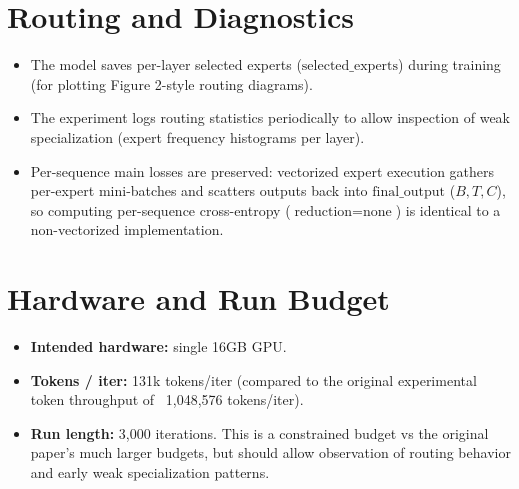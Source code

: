 \documentclass{article}
\begin{document}
\section{Routing and Diagnostics}
\begin{itemize}
    \item The model saves per-layer selected experts ($\text{selected\_experts}$) during training (for plotting Figure 2-style routing diagrams).
    \item The experiment logs routing statistics periodically to allow inspection of weak specialization (expert frequency histograms per layer).
    \item Per-sequence main losses are preserved: vectorized expert execution gathers per-expert mini-batches and scatters outputs back into $\text{final\_output}$ ($B, T, C$), so computing per-sequence cross-entropy ($\text{reduction}=\text{none}$) is identical to a non-vectorized implementation.
\end{itemize}

\section{Hardware and Run Budget}
\begin{itemize}
    \item \textbf{Intended hardware:} single 16GB GPU.
    \item \textbf{Tokens / iter:} 131k tokens/iter (compared to the original experimental token throughput of ~1,048,576 tokens/iter).
    \item \textbf{Run length:} 3,000 iterations. This is a constrained budget vs the original paper's much larger budgets, but should allow observation of routing behavior and early weak specialization patterns.
\end{itemize}
\end{document}
